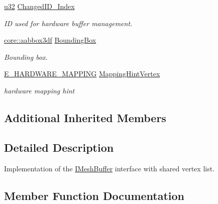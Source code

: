 \begin{DoxyCompactItemize}
\mbox{\label{structirr_1_1scene_1_1SSharedMeshBuffer_a854d104dc67995a49f65c902195e9d5f}} 
\hyperlink{namespaceirr_a0416a53257075833e7002efd0a18e804}{u32} \hyperlink{structirr_1_1scene_1_1SSharedMeshBuffer_a854d104dc67995a49f65c902195e9d5f}{Changed\+I\+D\+\_\+\+Index}
\begin{DoxyCompactList}\small\item\em ID used for hardware buffer management. \end{DoxyCompactList}\item 
\mbox{\label{structirr_1_1scene_1_1SSharedMeshBuffer_a98dc504864fb163b0628a658fa9897b5}} 
\hyperlink{namespaceirr_1_1core_adfc8fa01b30044c55f3332a1d6c1aa19}{core\+::aabbox3df} \hyperlink{structirr_1_1scene_1_1SSharedMeshBuffer_a98dc504864fb163b0628a658fa9897b5}{Bounding\+Box}
\begin{DoxyCompactList}\small\item\em Bounding box. \end{DoxyCompactList}\item 
\mbox{\label{structirr_1_1scene_1_1SSharedMeshBuffer_a9e78b3a22c91f6c0681335d0a71367e2}} 
\hyperlink{namespaceirr_1_1scene_ac7d8ee8d77da75f2580bb9bb17231c27}{E\+\_\+\+H\+A\+R\+D\+W\+A\+R\+E\+\_\+\+M\+A\+P\+P\+I\+NG} \hyperlink{structirr_1_1scene_1_1SSharedMeshBuffer_a9e78b3a22c91f6c0681335d0a71367e2}{Mapping\+Hint\+Vertex}
\begin{DoxyCompactList}\small\item\em hardware mapping hint \end{DoxyCompactList}\end{DoxyCompactItemize}
\subsection*{Additional Inherited Members}


\subsection{Detailed Description}
Implementation of the \hyperlink{classirr_1_1scene_1_1IMeshBuffer}{I\+Mesh\+Buffer} interface with shared vertex list. 

\subsection{Member Function Documentation}
\mbox{\label{structirr_1_1scene_1_1SSharedMeshBuffer_a0a37d52f7ec9917d9ca0d9dd908917b9}} 
